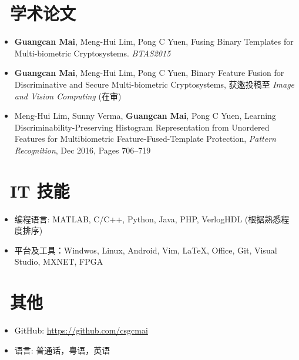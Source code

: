 \documentclass{resume}
\begin{document}
\section{\faBook\ 学术论文}
\begin{itemize}
	\item \textbf{Guangcan Mai}, Meng-Hui Lim, Pong C Yuen, Fusing Binary Templates for Multi-biometric Cryptosystems. \textit{BTAS2015}
	\item \textbf{Guangcan Mai}, Meng-Hui Lim, Pong C Yuen, Binary Feature Fusion for Discriminative and Secure Multi-biometric Cryptosystems, 获邀投稿至 \textit{Image and Vision Computing} (在审)
	\item Meng-Hui Lim, Sunny Verma, \textbf{Guangcan Mai}, Pong C Yuen, Learning Discriminability-Preserving Histogram Representation from Unordered Features for Multibiometric Feature-Fused-Template Protection, \textit{Pattern Recognition}, Dec 2016, Pages 706–719
\end{itemize}


\section{\faCogs\ IT 技能}
\begin{itemize}[parsep=0.5ex]
	\item 编程语言: MATLAB, C/C++, Python, Java, PHP, VerlogHDL (根据熟悉程度排序)
	\item 平台及工具：Windwos, Linux, Android,  Vim, \LaTeX, Office, Git, Visual Studio, MXNET, FPGA
\end{itemize}

\section{\faInfo\ 其他}
\begin{itemize}[parsep=0.5ex]
  \item GitHub: \url{https://github.com/csgcmai}
  \item 语言: 普通话，粤语，英语
\end{itemize}

%
%
\end{document}
